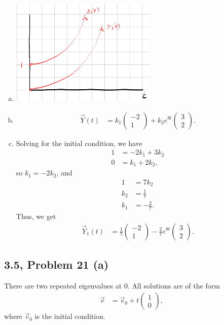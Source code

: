 \documentclass[10pt]{mypackage}
\begin{document}
\begin{enumerate}[(a)]
\begin{center}
    \end{center}
  \item \hfill
    \begin{center}
      \includegraphics[width=7cm]{images/3_5_18d.png}
    \end{center}
  \item 
    \begin{align*}
      \vec{Y}(t) &= k_1 \begin{pmatrix}-2\\1\end{pmatrix} + k_2e^{8t} \begin{pmatrix}3\\2\end{pmatrix}.
    \end{align*}
  \item Solving for the initial condition, we have
    \begin{align*}
      1 &= -2k_1 + 3k_2\\
      0 &= k_1 + 2k_2,
    \end{align*}
    so $k_1 = -2k_2$, and
    \begin{align*}
      1 &= 7k_2\\
      k_2 &= \frac{1}{7}\\
      k_1 &= -\frac{2}{7}.
    \end{align*}
    Thus, we get
    \begin{align*}
      \vec{Y}_1(t) &= \frac{1}{7} \begin{pmatrix}-2\\1\end{pmatrix} -\frac{2}{7}e^{8t} \begin{pmatrix}3\\2\end{pmatrix}.
    \end{align*}
\end{enumerate}
\subsection{3.5, Problem 21 (a)}%
There are two repeated eigenvalues at $0$. All solutions are of the form
\begin{align*}
  \vec{v} &= \vec{v}_0 + t \begin{pmatrix}1\\0\end{pmatrix},
\end{align*}
where $\vec{v}_0$ is the initial condition.
\end{document}
